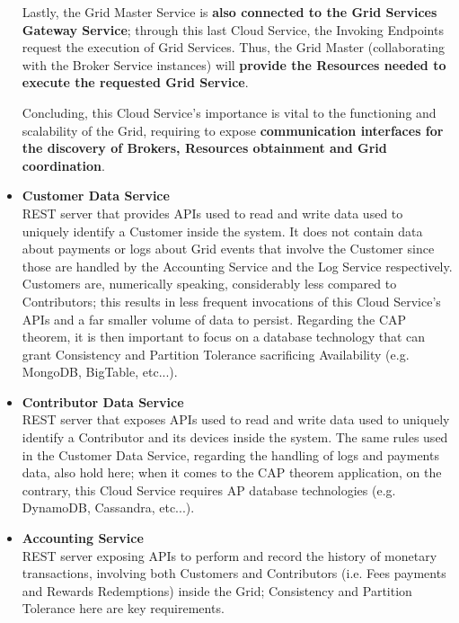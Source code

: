 \begin{itemize}
    Lastly, the Grid Master Service is \textbf{also connected to the Grid Services Gateway Service}; through this last Cloud Service, the Invoking Endpoints request the execution of Grid Services. Thus, the Grid Master (collaborating with the Broker Service instances) will \textbf{provide the Resources needed to execute the requested Grid Service}.

    Concluding, this Cloud Service's importance is vital to the functioning and scalability of the Grid, requiring to expose \textbf{communication interfaces for the discovery of Brokers, Resources obtainment and Grid coordination}.

    \item \textbf{Customer Data Service}\\
    REST server that provides APIs used to read and write data used to uniquely identify a Customer inside the system. It does not contain data about payments or logs about Grid events that involve the Customer since those are handled by the Accounting Service and the Log Service respectively.\\
    Customers are, numerically speaking, considerably less compared to Contributors; this results in less frequent invocations of this Cloud Service's APIs and a far smaller volume of data to persist. Regarding the CAP theorem, it is then important to focus on a database technology that can grant Consistency and Partition Tolerance sacrificing Availability (e.g. MongoDB, BigTable, etc...).

    \item \textbf{Contributor Data Service}\\
    REST server that exposes APIs used to read and write data used to uniquely identify a Contributor and its devices inside the system. The same rules used in the Customer Data Service, regarding the handling of logs and payments data, also hold here; when it comes to the CAP theorem application, on the contrary, this Cloud Service requires AP database technologies (e.g. DynamoDB, Cassandra, etc...).

    \item \textbf{Accounting Service}\\
    REST server exposing APIs to perform and record the history of monetary transactions, involving both Customers and Contributors (i.e. Fees payments and Rewards Redemptions) inside the Grid; Consistency and Partition Tolerance here are key requirements.


\end{itemize}
